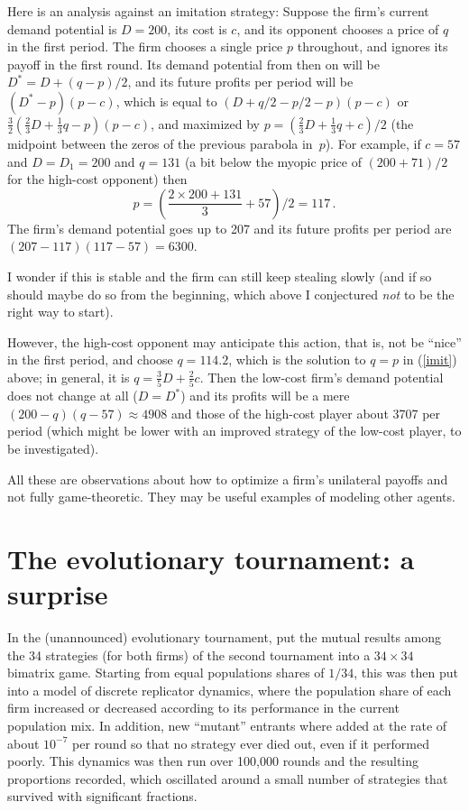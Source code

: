 \documentclass[a4paper,12pt]{article}  %
\theoremstyle{definition}
\begin{document}
Here is an analysis against an imitation strategy:
Suppose the firm's current demand potential
is $D=200$, its cost is $c$, and its opponent chooses a price
of $q$ in the first period. The firm chooses a single price
$p$ throughout, and ignores its payoff in the first round.
Its demand potential from then on will be
$D^* = D + (q - p)/2$, and its future profits per period
will be $(D^* - p)(p - c)$,
which is equal to $(D + q/2 -p/2 - p)(p-c)$ or
$\frac32(\frac23D + \frac13q - p)(p-c)$, and maximized by
$p = (\frac23D + \frac13q + c)/2$
(the midpoint between the zeros of the previous parabola
in~$p$).
For example, if $c=57$ and $D=D_1=200$ and $q=131$ (a bit below the
myopic price of $(200+71)/2$ for the high-cost opponent)
then 
\begin{equation}
\label{imit}
p = (\frac{2\times 200 + 131}3 + 57)/2 = 117\,.
\end{equation}
The firm's demand potential 
goes up to 207 and its future profits per period are
$(207-117)(117-57) = 6300$.

I wonder if this is stable and the firm can still keep stealing
slowly (and if so should maybe do so from the beginning,
which above I conjectured \textit{not} to be the right way to start). 

However, the high-cost opponent may anticipate this action,
that is, not be ``nice'' in the first period, and choose
$q=114.2$, which 
is the solution to $q = p$ in (\ref{imit}) above;
in general, it is $q=\frac35 D+ \frac25c$.
Then the low-cost firm's demand potential does not change at
all ($D=D^*$) and its profits will be a mere
$(200-q)(q-57)\approx 4908$ and those of the high-cost
player about 3707 per period (which might be lower with an
improved strategy of the low-cost player, to be
investigated).

All these are observations about how to optimize a firm's
unilateral payoffs and not fully game-theoretic.
They may be useful examples of modeling other agents.

\section{The evolutionary tournament: a surprise}
\label{s-evol}

In the (unannounced) evolutionary tournament, \citet{Keser1992}
put the mutual results among the 34 strategies (for both
firms) of the second tournament into a $34\times 34$ bimatrix
game.
Starting from equal populations shares of $1/34$, this was
then put into a model of discrete replicator dynamics, where 
the population share of each firm increased or decreased
according to its performance in the current population mix.
In addition, new ``mutant'' entrants where added at the rate
of about $10^{-7}$ per round so that no strategy ever died out,
even if it performed poorly.
This dynamics was then run over 100,000 rounds and the
resulting proportions recorded, which oscillated around 
a small number of strategies that survived with significant
fractions.
\end{document}
